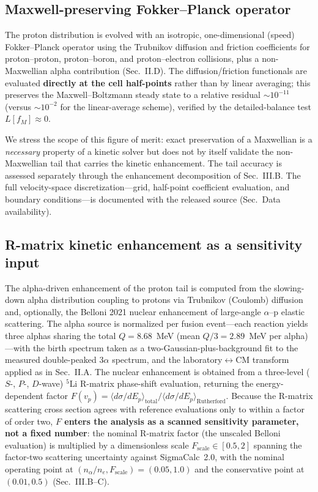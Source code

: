 \documentclass[aip,pop,reprint,amsmath,amssymb,floatfix]{revtex4-2}
\begin{document}
\subsection{Maxwell-preserving Fokker--Planck operator}

The proton distribution is evolved with an isotropic, one-dimensional (speed) Fokker--Planck operator using the Trubnikov diffusion and friction coefficients for proton--proton, proton--boron, and proton--electron collisions, plus a non-Maxwellian alpha contribution (Sec.~II.D). The diffusion/friction functionals are evaluated \textbf{directly at the cell half-points} rather than by linear averaging; this preserves the Maxwell--Boltzmann steady state to a relative residual $\sim\!10^{-11}$ (versus $\sim\!10^{-2}$ for the linear-average scheme), verified by the detailed-balance test $L[f_M]\approx 0$.

We stress the scope of this figure of merit: exact preservation of a Maxwellian is a \textit{necessary} property of a kinetic solver but does not by itself validate the non-Maxwellian tail that carries the kinetic enhancement. The tail accuracy is assessed separately through the enhancement decomposition of Sec.~III.B. The full velocity-space discretization---grid, half-point coefficient evaluation, and boundary conditions---is documented with the released source (Sec.~Data availability).

\subsection{R-matrix kinetic enhancement as a sensitivity input}

The alpha-driven enhancement of the proton tail is computed from the slowing-down alpha distribution coupling to protons via Trubnikov (Coulomb) diffusion and, optionally, the Belloni 2021 nuclear enhancement\cite{belloni} of large-angle $\alpha$--p elastic scattering. The alpha source is normalized per fusion event---each reaction yields three alphas sharing the total $Q = 8.68$~MeV (mean $Q/3 = 2.89$~MeV per alpha)---with the birth spectrum taken as a two-Gaussian-plus-background fit to the measured double-peaked $3\alpha$ spectrum\cite{stave}, and the laboratory$\leftrightarrow$CM transform applied as in Sec.~II.A. The nuclear enhancement is obtained from a three-level ($S$-, $P$-, $D$-wave) $^5$Li R-matrix phase-shift evaluation, returning the energy-dependent factor $F(v_p) = \langle d\sigma/dE_p\rangle_\mathrm{total} / \langle d\sigma/dE_p\rangle_\mathrm{Rutherford}$. Because the R-matrix scattering cross section agrees with reference evaluations only to within a factor of order two, \textbf{$F$ enters the analysis as a scanned sensitivity parameter, not a fixed number}: the nominal R-matrix factor (the unscaled Belloni evaluation) is multiplied by a dimensionless scale $F_\mathrm{scale}\in[0.5,2]$ spanning the factor-two scattering uncertainty against SigmaCalc~2.0, with the nominal operating point at $(n_\alpha/n_e, F_\mathrm{scale}) = (0.05, 1.0)$ and the conservative point at $(0.01, 0.5)$ (Sec.~III.B--C).
\end{document}
